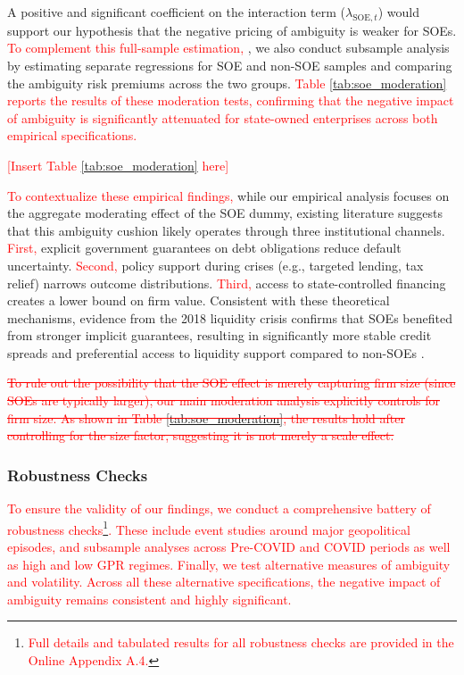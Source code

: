 \documentclass[preprint,12pt,authoryear]{elsarticle}
\begin{document}
A positive and significant coefficient on the interaction term ($\lambda_{\text{SOE},t}$) would support our hypothesis that the negative pricing of ambiguity is weaker for SOEs. \textcolor{red}{To complement this full-sample estimation, }, we also conduct subsample analysis by estimating separate regressions for SOE and non-SOE samples and comparing the ambiguity risk premiums across the two groups. \textcolor{red}{Table \ref{tab:soe_moderation} reports the results of these moderation tests, confirming that the negative impact of ambiguity is significantly attenuated for state-owned enterprises across both empirical specifications.}

\textcolor{red}{[Insert Table \ref{tab:soe_moderation} here]}

\textcolor{red}{To contextualize these empirical findings,} while our empirical analysis focuses on the aggregate moderating effect of the SOE dummy, existing literature suggests that this ambiguity cushion likely operates through three institutional channels. \textcolor{red}{First,} explicit government guarantees on debt obligations reduce default uncertainty. \textcolor{red}{Second,} policy support during crises (e.g., targeted lending, tax relief) narrows outcome distributions. \textcolor{red}{Third,} access to state-controlled financing creates a lower bound on firm value. Consistent with these theoretical mechanisms, evidence from the 2018 liquidity crisis confirms that SOEs benefited from stronger implicit guarantees, resulting in significantly more stable credit spreads and preferential access to liquidity support compared to non-SOEs \citep{Geng2024}.

\textcolor{red}{\st{To rule out the possibility that the SOE effect is merely capturing firm size (since SOEs are typically larger), our main moderation analysis explicitly controls for firm size. As shown in Table \ref{tab:soe_moderation}, the results hold after controlling for the size factor, suggesting it is not merely a scale effect.}}

\subsubsection{Robustness Checks}
\label{sec:robustness}

\textcolor{red}{To ensure the validity of our findings, we conduct a comprehensive battery of robustness checks\footnote{\textcolor{red}{Full details and tabulated results for all robustness checks are provided in the Online Appendix A.4.}}. These include event studies around major geopolitical episodes, and subsample analyses across Pre-COVID and COVID periods as well as high and low GPR regimes. Finally, we test alternative measures of ambiguity and volatility. Across all these alternative specifications, the negative impact of ambiguity remains consistent and highly significant.}
\end{document}
